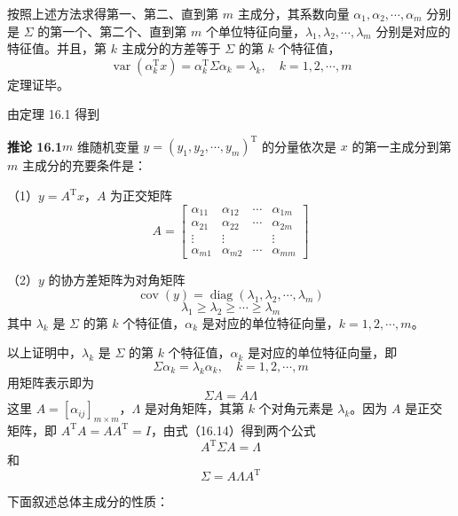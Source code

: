 \documentclass[UTF8,12pt,a4paper,fontset=fandol]{ctexart}
\begin{document}
按照上述方法求得第一、第二、直到第 $m$ 主成分，其系数向量 $\alpha_1,\alpha_2,\cdots,\alpha_m$ 分别是 $\Sigma$ 的第一个、第二个、直到第 $m$ 个单位特征向量，$\lambda_1,\lambda_2,\cdots,\lambda_m$ 分别是对应的特征值。并且，第 $k$ 主成分的方差等于 $\Sigma$ 的第 $k$ 个特征值，
\begin{equation}
\operatorname{var}(\alpha_k^{\mathrm{T}}x)=\alpha_k^{\mathrm{T}}\Sigma\alpha_k=\lambda_k,\quad k=1,2,\cdots,m
\tag{16.12}
\end{equation}
定理证毕。

由定理 16.1 得到

\noindent\textbf{推论 16.1}\quad $m$ 维随机变量 $y=(y_1,y_2,\cdots,y_m)^{\mathrm{T}}$ 的分量依次是 $x$ 的第一主成分到第 $m$ 主成分的充要条件是：

（1）$y=A^{\mathrm{T}}x$，$A$ 为正交矩阵
\[
A=
\begin{bmatrix}
\alpha_{11} & \alpha_{12} & \cdots & \alpha_{1m}\\
\alpha_{21} & \alpha_{22} & \cdots & \alpha_{2m}\\
\vdots & \vdots & & \vdots\\
\alpha_{m1} & \alpha_{m2} & \cdots & \alpha_{mm}
\end{bmatrix}
\]

（2）$y$ 的协方差矩阵为对角矩阵
\[
\operatorname{cov}(y)=\operatorname{diag}(\lambda_1,\lambda_2,\cdots,\lambda_m)
\]
\[
\lambda_1\geqslant\lambda_2\geqslant\cdots\geqslant\lambda_m
\]
其中 $\lambda_k$ 是 $\Sigma$ 的第 $k$ 个特征值，$\alpha_k$ 是对应的单位特征向量，$k=1,2,\cdots,m$。

以上证明中，$\lambda_k$ 是 $\Sigma$ 的第 $k$ 个特征值，$\alpha_k$ 是对应的单位特征向量，即
\begin{equation}
\Sigma\alpha_k=\lambda_k\alpha_k,\quad k=1,2,\cdots,m
\tag{16.13}
\end{equation}
用矩阵表示即为
\begin{equation}
\Sigma A=A\Lambda
\tag{16.14}
\end{equation}
这里 $A=[\alpha_{ij}]_{m\times m}$，$\Lambda$ 是对角矩阵，其第 $k$ 个对角元素是 $\lambda_k$。因为 $A$ 是正交矩阵，即 $A^{\mathrm{T}}A=AA^{\mathrm{T}}=I$，由式（16.14）得到两个公式
\begin{equation}
A^{\mathrm{T}}\Sigma A=\Lambda
\tag{16.15}
\end{equation}
和
\begin{equation}
\Sigma=A\Lambda A^{\mathrm{T}}
\tag{16.16}
\end{equation}

下面叙述总体主成分的性质：
\end{document}
